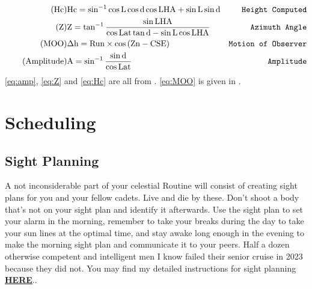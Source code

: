 \documentclass[letterpaper,12pt]{article}
\begin{document}
\begin{align}
	\label{eq:Hc}\tag{Hc}	&\text{Hc}=\sin^{-1}{\cos{\text{L}}\cos{\text{d}}\cos{\text{LHA}}+\sin{\text{L}}\sin{\text{d}}}  &
	\text{\texttt{Height Computed}}\\
	\label{eq:Z}\tag{Z}	   &\text{Z}=\tan^{-1}{\frac{\sin{\text{LHA}}}{\cos{\text{Lat}\tan\text{{d}}-\sin{\text{L}}\cos{\text{LHA}}}}}   &\text{\texttt{Azimuth Angle}}\\
   \label{eq:MOO}\tag{MOO} &\Delta\text{h}=\text{Run}\times\cos{(\text{Zn}-\text{CSE})}  &\text{\texttt{Motion of Observer}}\\
  \label{eq:amp}\tag{Amplitude}&\text{A}=\sin^{-1}\frac{\sin{\text{d}}}{\cos{\text{Lat}}}	&\text{\texttt{Amplitude}}
\end{align}
\ref{eq:amp}, \ref{eq:Z} and \ref{eq:Hc} are all from .
\ref{eq:MOO} is given in .
\section{Scheduling}
\subsection{Sight Planning}
A not inconsiderable part of your celestial Routine will consist of creating sight plans for you and your fellow cadets.
 Live and die by these.
 Don't shoot a body that's not on your sight plan and identify it afterwards.
 Use the sight plan to set your alarm in the morning, remember to take your breaks during the day to take your sun lines at the optimal time, and stay awake long enough in the evening to make the morning sight plan and communicate it to your peers.
 Half a dozen otherwise competent and intelligent men I know failed their senior cruise in 2023 because they did not.
 You may find my detailed instructions for sight planning \hyperlink{https://www.csum.edu/tutoring/media/celnavjoey.pdf}{\textbf{HERE}}..
\end{document}
